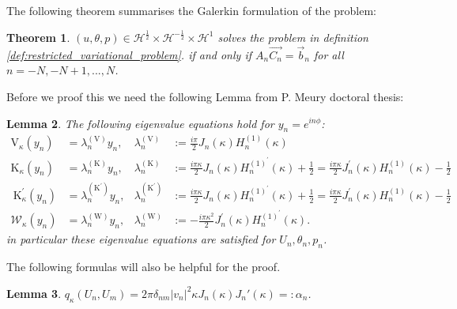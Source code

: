 \documentclass[10pt,journal,compsoc, onecolumn]{IEEEtran}
\newtheorem{theorem}{Theorem}[section]
\newtheorem{lemma}[theorem]{Lemma}
\begin{document}
The following theorem summarises the Galerkin formulation of the problem: 
\begin{theorem}
    \label{thm:galerkin_matrix}
    \((u, \theta, p) \in  \mathcal{H}^{\frac{1}{2}} \times \mathcal{H}^{-\frac{1}{2}} \times \mathcal{H}^{1}\) solves the problem in definition \ref{def:restricted_variational_problem}.
    if and only if $A_n\vec{C_n} = \vec{b}_n$ for all  $n = -N, -N + 1, ..., N$. 
\end{theorem}

Before we proof this we need the following Lemma from P. Meury doctoral thesis: 
\begin{lemma}
    The following eigenvalue equations hold for $y_n = e^{i n \phi}$:
    $$
    \begin{aligned} 
        \mathrm{V}_{\kappa}\left(y_{n}\right) &=\lambda_{n}^{(\mathrm{V})} y_{n}, & \lambda_{n}^{(\mathrm{V})} &:=\frac{i \pi}{2} J_{n}(\kappa) H_{n}^{(1)}(\kappa) \\ 
        \mathrm{K}_{\kappa}\left(y_{n}\right) &=\lambda_{n}^{(\mathrm{K})} y_{n}, & \lambda_{n}^{(\mathrm{K})} &:=\frac{i \pi \kappa}{2} J_{n}(\kappa) H_{n}^{(1)^{\prime}}(\kappa)+\frac{1}{2}=\frac{i \pi \kappa}{2} J_{n}^{\prime}(\kappa) H_{n}^{(1)}(\kappa)-\frac{1}{2} \\ 
        \mathrm{~K}_{\kappa}^{\prime}\left(y_{n}\right) &=\lambda_{n}^{\left(\mathrm{K}^{\prime}\right)} y_{n}, & \lambda_{n}^{\left(\mathrm{K}^{\prime}\right)} &:=\frac{i \pi \kappa}{2} J_{n}(\kappa) H_{n}^{(1)^{\prime}}(\kappa)+\frac{1}{2}=\frac{i \pi \kappa}{2} J_{n}^{\prime}(\kappa) H_{n}^{(1)}(\kappa)-\frac{1}{2} \\ 
        \mathcal{W}_{\kappa}\left(y_{n}\right) &=\lambda_{n}^{(\mathrm{W})} y_{n}, & \lambda_{n}^{(\mathrm{W})} &:= - \frac{i \pi \kappa^{2}}{2} J_{n}^{\prime}(\kappa) H_{n}^{(1)^{\prime}}(\kappa).
    \end{aligned}
    $$
    in particular these eigenvalue equations are satisfied for $U_n, \theta_n, p_n$.
\end{lemma}
The following formulas will also be helpful for the proof.
\begin{lemma}
    $q_\kappa(U_n, U_m) = 2 \pi  \delta_{nm}|v_n|^2\kappa  J_n(\kappa ) J_n'(\kappa ) =: \alpha_n$.
\end{lemma}
\end{document}
